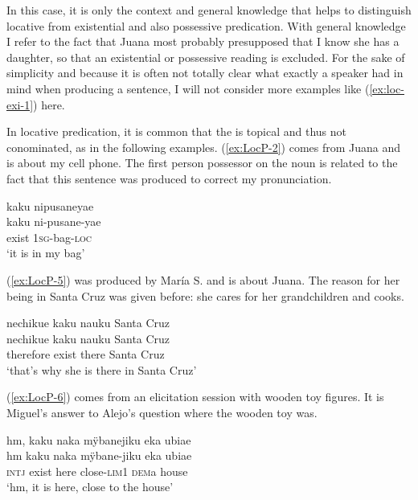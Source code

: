 In this case, it is only the context and general knowledge that helps to distinguish locative from existential and also possessive predication. With general knowledge I refer to the fact that Juana most probably presupposed that I know she has a daughter, so that an existential or possessive reading is excluded. For the sake of simplicity and because it is often not totally clear what exactly a speaker had in mind when producing a sentence, I will not consider more examples like (\ref{ex:loc-exi-1}) here.

In locative predication, it is common that the  is topical and thus not conominated, as in the following examples. (\ref{ex:LocP-2}) comes from Juana and is about my cell phone. The first person possessor on the noun is related to the fact that this sentence was produced to correct my pronunciation.

\ea\label{ex:LocP-2}
\begingl 
\glpreamble kaku nipusaneyae\\
\gla kaku ni-pusane-yae \\ 
\glb exist 1\textsc{sg}-bag-\textsc{loc}\\ 
\glft ‘it is in my bag’
\trailingcitation{[jxx-p110923l-2.040]}
\xe

(\ref{ex:LocP-5}) was produced by María S. and is about Juana. The reason for her being in Santa Cruz was given before: she cares for her grandchildren and cooks.

\ea\label{ex:LocP-5}
\begingl
\glpreamble nechikue kaku nauku Santa Cruz\\
\gla nechikue kaku nauku {Santa Cruz}\\
\glb therefore exist there {Santa Cruz}\\
\glft ‘that’s why she is there in Santa Cruz’
\endgl
\trailingcitation{[rxx-e120511l.120]}
\xe

(\ref{ex:LocP-6}) comes from an elicitation session with wooden toy figures. It is Miguel’s answer to Alejo’s question where the wooden toy was.

\ea\label{ex:LocP-6}
\begingl
\glpreamble hm, kaku naka mÿbanejiku eka ubiae\\
\gla hm kaku naka mÿbane-jiku eka ubiae\\
\glb \textsc{intj} exist here close-\textsc{lim}1 \textsc{dem}a house\\
\glft ‘hm, it is here, close to the house’
\endgl
\trailingcitation{[mtx-e110915ls.47]}
\xe

